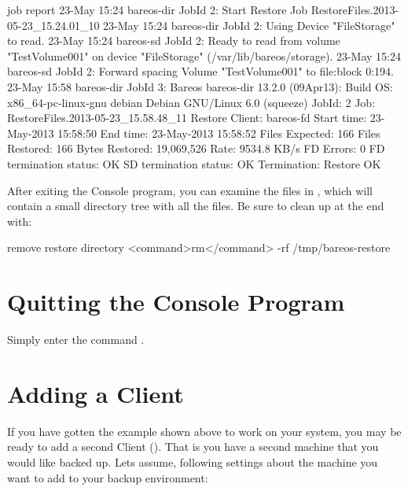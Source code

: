 \footnotesize
\begin{bconsole}{job report}
23-May 15:24 bareos-dir JobId 2: Start Restore Job RestoreFiles.2013-05-23_15.24.01_10
23-May 15:24 bareos-dir JobId 2: Using Device "FileStorage" to read.
23-May 15:24 bareos-sd JobId 2: Ready to read from volume "TestVolume001" on device "FileStorage" (/var/lib/bareos/storage).
23-May 15:24 bareos-sd JobId 2: Forward spacing Volume "TestVolume001" to file:block 0:194.
23-May 15:58 bareos-dir JobId 3: Bareos bareos-dir 13.2.0 (09Apr13):
  Build OS:               x86_64-pc-linux-gnu debian Debian GNU/Linux 6.0 (squeeze)
  JobId:                  2
  Job:                    RestoreFiles.2013-05-23_15.58.48_11
  Restore Client:         bareos-fd
  Start time:             23-May-2013 15:58:50
  End time:               23-May-2013 15:58:52
  Files Expected:         166
  Files Restored:         166
  Bytes Restored:         19,069,526
  Rate:                   9534.8 KB/s
  FD Errors:              0
  FD termination status:  OK
  SD termination status:  OK
  Termination:            Restore OK
\end{bconsole}
\normalsize

After exiting the Console program, you can examine the files in ,
which will contain a small directory tree with all the
files. Be sure to clean up at the end with:

\begin{commands}{remove restore directory}
<command>rm</command> -rf /tmp/bareos-restore
\end{commands}

\section{Quitting the Console Program}

Simply enter the command .

\section{Adding a Client}
\label{SecondClient}
\label{sec:AddAClient}

If you have gotten the example shown above to work on your system, you may be
ready to add a second Client (\bareosFd). That is you have a second machine
that you would like backed up.
Lets assume, following settings about the machine you want to add to your backup environment:


